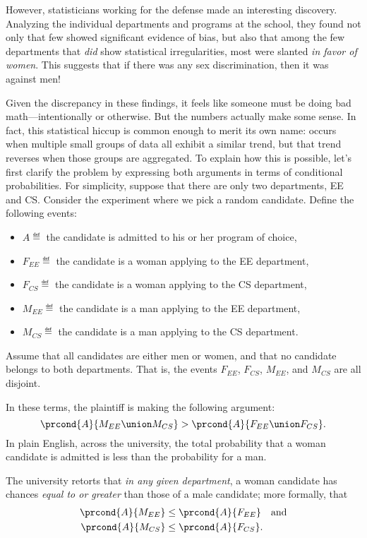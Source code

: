 However, statisticians working for the defense made an interesting
discovery.  Analyzing the individual departments and programs at the
school, they found not only that few showed significant evidence of bias, but
also that among the few departments that \emph{did} show
statistical irregularities, most were slanted \emph{in favor of women}.
This suggests that if there was any sex discrimination, then it was
against men!  

Given the discrepancy in these findings, it feels like someone must be
doing bad math---intentionally or otherwise.  But the numbers actually
make some sense.  In fact, this statistical hiccup is common enough to
merit its own name:  occurs when multiple
small groups of data all exhibit a similar trend, but that trend
reverses when those groups are aggregated.  To explain how this is
possible, let's first clarify the problem by expressing both arguments
in terms of conditional probabilities.  For simplicity, suppose
that there are only two departments, EE and CS.  Consider the
experiment where we pick a random candidate.  Define the following
events:
%
\begin{itemize}
\item $A \eqdef$ the candidate is admitted to his or her program of choice,
\item $F_{EE} \eqdef$ the candidate is a woman applying to the EE department,
\item $F_{CS} \eqdef$ the candidate is a woman applying to the CS department,
\item $M_{EE} \eqdef$ the candidate is a man applying to the EE department,
\item $M_{CS} \eqdef$ the candidate is a man applying to the CS department.
\end{itemize}
Assume that all candidates are either men or women, and that no
candidate belongs to both departments. That is,  the events $F_{EE}$,
$F_{CS}$, $M_{EE}$, and $M_{CS}$ are all disjoint.

In these terms, the plaintiff is making the following argument:
\[
    \prcond{A}{M_{EE} \union M_{CS}} > \prcond{A}{F_{EE} \union F_{CS}}.
\]
In plain English, across the university, the total probability that a woman candidate
is admitted is less than the probability for a man.

The university retorts that \emph{in any given department}, a woman
candidate has chances \emph{equal to or greater} than those of a male
candidate; more formally, that
\begin{align*}
\prcond{A}{M_{EE}} & \leq \prcond{A}{F_{EE}} \quad\text{and}\\
\prcond{A}{M_{CS}} & \leq \prcond{A}{F_{CS}}.
\end{align*}

